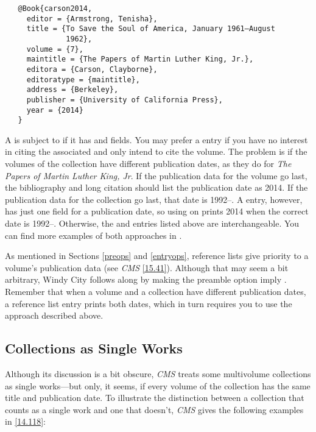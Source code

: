\documentclass[11pt,letterpaper,oneside]{article}
\begin{document}
\begin{verbatim}
   @Book{carson2014,
     editor = {Armstrong, Tenisha},
     title = {To Save the Soul of America, January 1961–August
              1962},
     volume = {7},
     maintitle = {The Papers of Martin Luther King, Jr.},
     editora = {Carson, Clayborne},
     editoratype = {maintitle},
     address = {Berkeley},
     publisher = {University of California Press},
     year = {2014}
   }
\end{verbatim}

A  is subject to  if it has
 and  fields. You may prefer a
 entry if you have no interest in citing the associated
 and only intend to cite the volume. The problem
is if the volumes of the collection have different publication dates,
as they do for \textit{The Papers of Martin Luther King, Jr}. If the
publication data for the volume go last, the bibliography and long
citation should list the publication date as 2014. If the publication
data for the collection go last, that date is 1992–. A 
entry, however, has just one field for a publication date, so using
 on  prints 2014 when the correct
date is 1992–. Otherwise, the  and 
entries listed above are interchangeable. You can find more examples
of both approaches in .

As mentioned in Sections \ref{preops} and \ref{entryops}, reference
lists give priority to a volume's publication data (see
\textit{CMS} \ref{15.41}). Although that may seem a bit arbitrary,
Windy City follows along by making the  preamble option
imply . Remember that when a volume and a collection
have different publication dates, a reference list entry prints both
dates, which in turn requires you to use the  approach
described above.

\begin{refonly}
\nocite{armstrong2014}
\end{refonly}

\subsection{Collections as Single Works}
\label{multivolume}

Although its discussion is a bit obscure, \textit{CMS} treats some
multivolume collections as single works---but only, it seems, if every
volume of the collection has the same title and publication date. To
illustrate the distinction between a collection that counts as a
single work and one that doesn't, \textit{CMS} gives the following
examples in \ref{14.118}:
\end{document}
